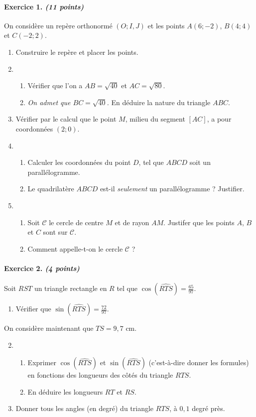 \documentclass[11pt]{article}
\begin{document}
\paragraph{Exercice 1. \emph{(11 points)}} On considère un repère orthonormé $(O; I, J)$ et les
points $A(6; -2)$, $B(4; 4)$ et $C(-2;2)$.
\begin{enumerate}
  \item Construire le repère et placer les points.
  \item \begin{enumerate}
      \item Vérifier que l'on a $AB=\sqrt{40}$ et $AC=\sqrt{80}$.
      \item \emph{On admet que $BC=\sqrt{40}$.} En déduire la nature du triangle $ABC$.
    \end{enumerate}
  \item Vérifier  par le calcul que le point $M$, milieu du segment $\left[ AC
    \right]$, a pour coordonnées $(2;0)$.
  \item \begin{enumerate}
      \item Calculer les coordonnées du point $D$, tel que $ABCD$ soit un
    parallélogramme.
  \item Le quadrilatère $ABCD$ est-il \emph{seulement} un parallélogramme ?
    Justifier.
    \end{enumerate}
  \item \begin{enumerate}
      \item Soit $\mathscr C$ le cercle de centre $M$ et de rayon $AM$. Justifer
        que les points $A$, $B$ et $C$ sont sur $\mathscr C$.
      \item Comment appelle-t-on le cercle $\mathscr C$ ?
    \end{enumerate}
\end{enumerate}

\paragraph{Exercice 2. \emph{(4 points)}} Soit $RST$ un triangle rectangle en $R$ tel que
$\cos\left( \widehat{RTS} \right)=\frac{65}{97}$.
\begin{enumerate}
  \item Vérifier que $\sin\left( \widehat{RTS} \right)=\frac{72}{97}$.
\end{enumerate}
\noindent On considère maintenant que $TS=9,7$ cm.
\begin{enumerate}
    \setcounter{enumi}{1}
  \item \begin{enumerate}
      \item Exprimer $\cos\left( \widehat{RTS} \right)$ et
        $\sin\left(\widehat{RTS}\right)$ (c'est-à-dire donner les formules) en fonctions des longueurs des côtés du triangle
    $RTS$.
  \item En déduire les longueurs $RT$ et $RS$.
    \end{enumerate}
  \item Donner tous les angles (en degré) du triangle $RTS$, à $0,1$ degré près.
\end{enumerate}
\end{document}
